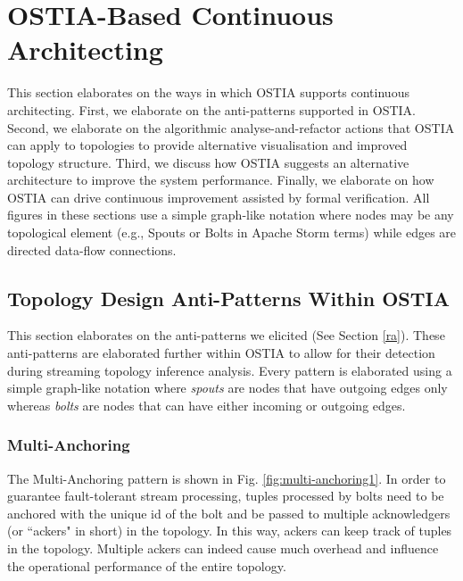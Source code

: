\section{OSTIA-Based Continuous Architecting}
This section elaborates on the ways in which OSTIA supports continuous
architecting. First, we elaborate on the anti-patterns supported in
OSTIA. Second, we elaborate on the algorithmic analyse-and-refactor actions that OSTIA can
apply to topologies to provide alternative visualisation and improved topology structure. Third, we discuss how
OSTIA suggests an alternative architecture to improve the system
performance. Finally, we elaborate on how OSTIA can drive continuous
improvement assisted by formal verification. All figures in these sections use a
simple graph-like notation where nodes may be any topological element (e.g.,
Spouts or Bolts in Apache Storm terms) while edges are directed data-flow
connections.

\subsection{Topology Design Anti-Patterns Within OSTIA}\label{sec:anti-pattern}
This section elaborates on the anti-patterns we elicited (See Section \ref{ra}). These anti-patterns are elaborated further within OSTIA to allow for their detection during streaming topology inference analysis. Every pattern is elaborated using a simple graph-like notation where \emph{spouts} are nodes that have outgoing edges only whereas \emph{bolts} are nodes that can have either incoming or outgoing edges.

\subsubsection{Multi-Anchoring}
The Multi-Anchoring pattern is shown in Fig. \ref{fig:multi-anchoring1}. In order to guarantee fault-tolerant stream processing, tuples processed by bolts need to be anchored with the unique {\sf id} of the bolt and be passed to multiple acknowledgers (or ``ackers" in short) in the topology. In this way, ackers can keep track of tuples in the topology. Multiple ackers can indeed cause much overhead and influence the operational performance of the entire topology.


